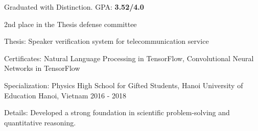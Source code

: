 \begin{cventries}
{      %
    \begin{cvitems} %
        \item {Graduated with Distinction. GPA:} \textbf{3.52/4.0}
        \item {2nd place in the Thesis defense committee} 
        \item {Thesis: Speaker verification system for telecommunication service}
        \item {Certificates: Natural Language Processing in TensorFlow, Convolutional Neural Networks in TensorFlow}
    \end{cvitems}
    }

\cventry
    {Specialization: Physics}
    {High School for Gifted Students, Hanoi University of Education}
    {Hanoi, Vietnam}
    {2016 - 2018}
    {
        \begin{cvitems}
            \item {Details: Developed a strong foundation in scientific problem-solving and quantitative reasoning.}
        \end{cvitems}
    }
    
\end{cventries}
